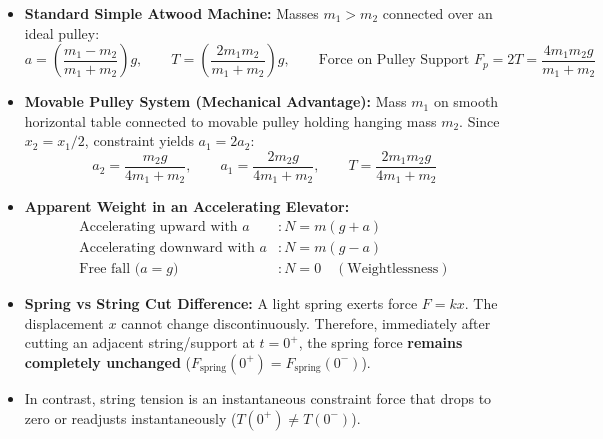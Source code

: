 \documentclass[10pt,a4paper]{article}
\begin{document}
\begin{usecasebox}
\begin{itemize}
  \item \textbf{Standard Simple Atwood Machine:} Masses $m_1 > m_2$ connected over an ideal pulley:
  \begin{equation}
    a = \left(\frac{m_1 - m_2}{m_1 + m_2}\right)g, \qquad T = \left(\frac{2m_1 m_2}{m_1 + m_2}\right)g, \qquad \text{Force on Pulley Support } F_p = 2T = \frac{4m_1 m_2 g}{m_1 + m_2}
  \end{equation}
  \item \textbf{Movable Pulley System (Mechanical Advantage):} Mass $m_1$ on smooth horizontal table connected to movable pulley holding hanging mass $m_2$. Since $x_2 = x_1/2$, constraint yields $a_1 = 2a_2$:
  \begin{equation}
    a_2 = \frac{m_2 g}{4m_1 + m_2}, \qquad a_1 = \frac{2m_2 g}{4m_1 + m_2}, \qquad T = \frac{2m_1 m_2 g}{4m_1 + m_2}
  \end{equation}
  \item \textbf{Apparent Weight in an Accelerating Elevator:}
  \begin{align}
    \text{Accelerating upward with } a &: N = m(g + a) \\
    \text{Accelerating downward with } a &: N = m(g - a) \\
    \text{Free fall ($a = g$)} &: N = 0 \quad (\text{Weightlessness})
  \end{align}
\end{itemize}
\end{usecasebox}

\begin{trapbox}
\begin{itemize}
  \item \textbf{Spring vs String Cut Difference:} A light spring exerts force $F = kx$. The displacement $x$ cannot change discontinuously. Therefore, immediately after cutting an adjacent string/support at $t = 0^+$, the spring force \textbf{remains completely unchanged} ($F_{\text{spring}}(0^+) = F_{\text{spring}}(0^-)$).
  \item In contrast, string tension is an instantaneous constraint force that drops to zero or readjusts instantaneously ($T(0^+) \neq T(0^-)$).
\end{itemize}
\end{trapbox}
\end{document}
